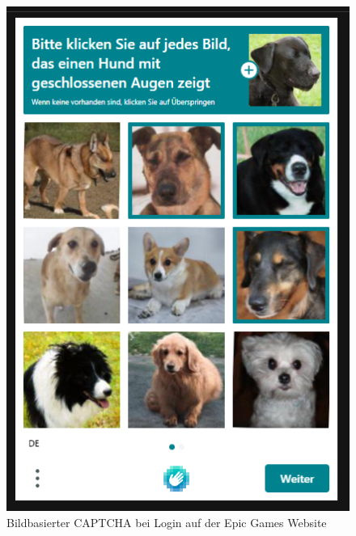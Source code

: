\begin{figure}
    \centering
    \includegraphics{gfx/mygraphics/fuerfortnite.png}
    \caption{Bildbasierter CAPTCHA bei Login auf der Epic Games Website}   
    \label{fig:fortnite}
\end{figure}

\cite{gamified}

